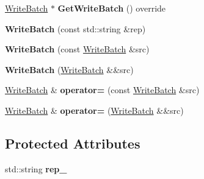 \begin{DoxyCompactItemize}
\item 
\hyperlink{classrocksdb_1_1WriteBatch}{Write\+Batch} $\ast$ {\bfseries Get\+Write\+Batch} () override\hypertarget{classrocksdb_1_1WriteBatch_adc9fd017eeb793870c7be25f61c738c6}{}\label{classrocksdb_1_1WriteBatch_adc9fd017eeb793870c7be25f61c738c6}

\item 
{\bfseries Write\+Batch} (const std\+::string \&rep)\hypertarget{classrocksdb_1_1WriteBatch_ac006fc99243d375a9554278a439fd75f}{}\label{classrocksdb_1_1WriteBatch_ac006fc99243d375a9554278a439fd75f}

\item 
{\bfseries Write\+Batch} (const \hyperlink{classrocksdb_1_1WriteBatch}{Write\+Batch} \&src)\hypertarget{classrocksdb_1_1WriteBatch_abc6cc25db792efc196b429f2f2a22ff8}{}\label{classrocksdb_1_1WriteBatch_abc6cc25db792efc196b429f2f2a22ff8}

\item 
{\bfseries Write\+Batch} (\hyperlink{classrocksdb_1_1WriteBatch}{Write\+Batch} \&\&src)\hypertarget{classrocksdb_1_1WriteBatch_a5c7434403a6968c069bcb94f7ffbfdc9}{}\label{classrocksdb_1_1WriteBatch_a5c7434403a6968c069bcb94f7ffbfdc9}

\item 
\hyperlink{classrocksdb_1_1WriteBatch}{Write\+Batch} \& {\bfseries operator=} (const \hyperlink{classrocksdb_1_1WriteBatch}{Write\+Batch} \&src)\hypertarget{classrocksdb_1_1WriteBatch_a4b75d4ffa2c7f8e979e97ab851a4ee65}{}\label{classrocksdb_1_1WriteBatch_a4b75d4ffa2c7f8e979e97ab851a4ee65}

\item 
\hyperlink{classrocksdb_1_1WriteBatch}{Write\+Batch} \& {\bfseries operator=} (\hyperlink{classrocksdb_1_1WriteBatch}{Write\+Batch} \&\&src)\hypertarget{classrocksdb_1_1WriteBatch_a240498adab09ac235d766c694e4fb97a}{}\label{classrocksdb_1_1WriteBatch_a240498adab09ac235d766c694e4fb97a}

\end{DoxyCompactItemize}
\subsection*{Protected Attributes}
\begin{DoxyCompactItemize}
\item 
std\+::string {\bfseries rep\+\_\+}\hypertarget{classrocksdb_1_1WriteBatch_afca810db729d1b7fcc1526ab592d755b}{}\label{classrocksdb_1_1WriteBatch_afca810db729d1b7fcc1526ab592d755b}

\end{DoxyCompactItemize}
